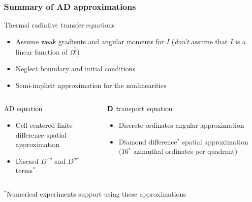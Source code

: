 \documentclass{beamer}
\newcommand{\Dtens}{\mat{D}}
\begin{document}
\begin{frame}
  \frametitle{Summary of AD approximations}
  \begin{block}{Thermal radiative transfer equations}
    \begin{itemize}
      \item Assume weak gradients and angular moments for $I$ (\emph{don't}
        assume that $I$ is a linear function of $\vec{\Omega}$!)
      \item Neglect boundary and initial conditions
      \item Semi-implicit approximation for the nonlinearities
    \end{itemize}
  \end{block}
  \vspace{-\baselineskip}
  \begin{columns}[t]
    \begin{column}{.48\textwidth}
  \begin{block}{AD equation}
    \begin{itemize}
      \item Cell-centered finite difference spatial approximation
      \item Discard $D^{xy}$ and $D^{yx}$ terms$^*$
    \end{itemize}
  \end{block}
    \end{column}
    \begin{column}{.48\textwidth}
  \begin{block}{$\Dtens$ transport equation}
    \begin{itemize}
      \item Discrete ordinates angular approximation
      \item Diamond difference$^*$ spatial approximation (16$^*$ azimuthal ordinates
        per quadrant)
    \end{itemize}
  \end{block}
    \end{column}
  \end{columns}
  {\small $^*$Numerical experiments support using these approximations}
\end{frame}

\end{document}
